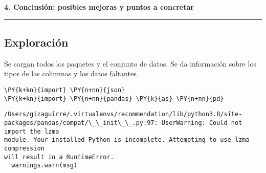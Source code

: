 \textbf{4. Conclusión: posibles mejoras y puntos a concretar}

    \begin{center}\rule{0.5\linewidth}{0.5pt}\end{center}

\hypertarget{exploraciuxf3n}{%
\subsection{Exploración}\label{exploraciuxf3n}}

Se cargan todos los paquetes y el conjunto de datos. Se da información
sobre los tipos de las columnas y los datos faltantes.

    \begin{tcolorbox}[breakable, size=fbox, boxrule=1pt, pad at break*=1mm,colback=cellbackground, colframe=cellborder]
\begin{Verbatim}[commandchars=\\\{\}]
\PY{k+kn}{import} \PY{n+nn}{json}
\PY{k+kn}{import} \PY{n+nn}{pandas} \PY{k}{as} \PY{n+nn}{pd}
\end{Verbatim}
\end{tcolorbox}

    \begin{Verbatim}[commandchars=\\\{\}]
/Users/gizaguirre/.virtualenvs/recommendation/lib/python3.8/site-
packages/pandas/compat/\_\_init\_\_.py:97: UserWarning: Could not import the lzma
module. Your installed Python is incomplete. Attempting to use lzma compression
will result in a RuntimeError.
  warnings.warn(msg)
    \end{Verbatim}

